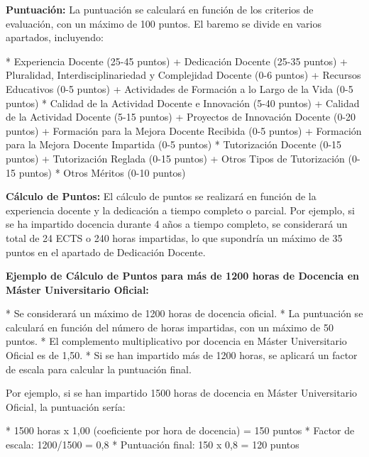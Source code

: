 \documentclass{article}
\begin{document}
\begin{itemize}
\begin{itemize}
                        \textbf{Puntuación:}
                        La puntuación se calculará en función de los criterios de evaluación, con un máximo de 100 puntos. El baremo se divide en varios apartados, incluyendo:

                        * Experiencia Docente (25-45 puntos)
                        + Dedicación Docente (25-35 puntos)
                        + Pluralidad, Interdisciplinariedad y Complejidad Docente (0-6 puntos)
                        + Recursos Educativos (0-5 puntos)
                        + Actividades de Formación a lo Largo de la Vida (0-5 puntos)
                        * Calidad de la Actividad Docente e Innovación (5-40 puntos)
                        + Calidad de la Actividad Docente (5-15 puntos)
                        + Proyectos de Innovación Docente (0-20 puntos)
                        + Formación para la Mejora Docente Recibida (0-5 puntos)
                        + Formación para la Mejora Docente Impartida (0-5 puntos)
                        * Tutorización Docente (0-15 puntos)
                        + Tutorización Reglada (0-15 puntos)
                        + Otros Tipos de Tutorización (0-15 puntos)
                        * Otros Méritos (0-10 puntos)

                        \textbf{Cálculo de Puntos:}
                        El cálculo de puntos se realizará en función de la experiencia docente y la dedicación a tiempo completo o parcial. Por ejemplo, si se ha impartido docencia durante 4 años a tiempo completo, se considerará un total de 24 ECTS o 240 horas impartidas, lo que supondría un máximo de 35 puntos en el apartado de Dedicación Docente.

                        \textbf{Ejemplo de Cálculo de Puntos para más de 1200 horas de Docencia en Máster Universitario Oficial:}

                        * Se considerará un máximo de 1200 horas de docencia oficial.
                        * La puntuación se calculará en función del número de horas impartidas, con un máximo de 50 puntos.
                        * El complemento multiplicativo por docencia en Máster Universitario Oficial es de 1,50.
                        * Si se han impartido más de 1200 horas, se aplicará un factor de escala para calcular la puntuación final.

                        Por ejemplo, si se han impartido 1500 horas de docencia en Máster Universitario Oficial, la puntuación sería:

                        * 1500 horas x 1,00 (coeficiente por hora de docencia) = 150 puntos
                        * Factor de escala: 1200/1500 = 0,8
                        * Puntuación final: 150 x 0,8 = 120 puntos


\end{itemize}
\end{itemize}
\end{document}
